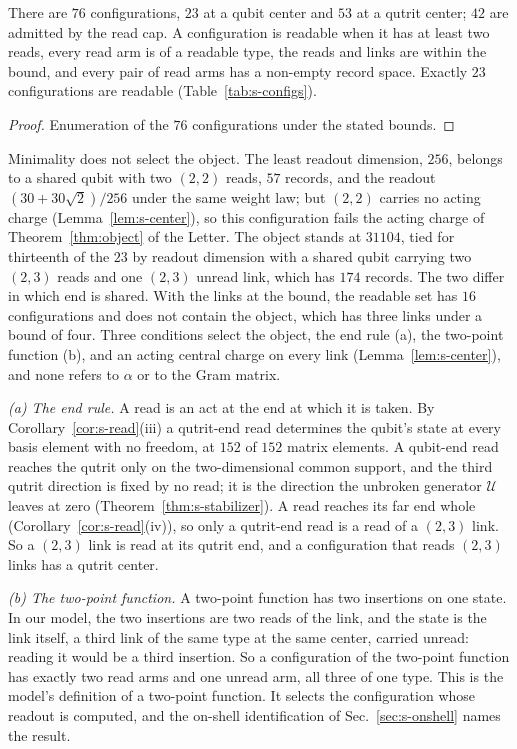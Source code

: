 \begin{theorem}
\label{thm:s-config}
There are $76$ configurations, $23$ at a qubit center and $53$ at a qutrit center; $42$ are admitted by the read cap. A configuration is readable when it has at least two reads, every read arm is of a readable type, the reads and links are within the bound, and every pair of read arms has a non-empty record space. Exactly $23$ configurations are readable (Table~\ref{tab:s-configs}).
\end{theorem}
\begin{proof}
Enumeration of the $76$ configurations under the stated bounds.
\end{proof}

Minimality does not select the object. The least readout dimension, $256$, belongs to a shared qubit with two $(2,2)$ reads, $57$ records, and the readout $(30+30\sqrt{2})/256$ under the same weight law; but $(2,2)$ carries no acting charge (Lemma~\ref{lem:s-center}), so this configuration fails the acting charge of Theorem~\ref{thm:object} of the Letter. The object stands at $31104$, tied for thirteenth of the $23$ by readout dimension with a shared qubit carrying two $(2,3)$ reads and one $(2,3)$ unread link, which has $174$ records. The two differ in which end is shared. With the links at the bound, the readable set has $16$ configurations and does not contain the object, which has three links under a bound of four. Three conditions select the object, the end rule (a), the two-point function (b), and an acting central charge on every link (Lemma~\ref{lem:s-center}), and none refers to $\alpha$ or to the Gram matrix.

\emph{(a) The end rule.} A read is an act at the end at which it is taken. By Corollary~\ref{cor:s-read}(iii) a qutrit-end read determines the qubit's state at every basis element with no freedom, at $152$ of $152$ matrix elements. A qubit-end read reaches the qutrit only on the two-dimensional common support, and the third qutrit direction is fixed by no read; it is the direction the unbroken generator $\mathcal{U}$ leaves at zero (Theorem~\ref{thm:s-stabilizer}). A read reaches its far end whole (Corollary~\ref{cor:s-read}(iv)), so only a qutrit-end read is a read of a $(2,3)$ link. So a $(2,3)$ link is read at its qutrit end, and a configuration that reads $(2,3)$ links has a qutrit center.

\emph{(b) The two-point function.} A two-point function has two insertions on one state. In our model, the two insertions are two reads of the link, and the state is the link itself, a third link of the same type at the same center, carried unread: reading it would be a third insertion. So a configuration of the two-point function has exactly two read arms and one unread arm, all three of one type. This is the model's definition of a two-point function. It selects the configuration whose readout is computed, and the on-shell identification of Sec.~\ref{sec:s-onshell} names the result.

